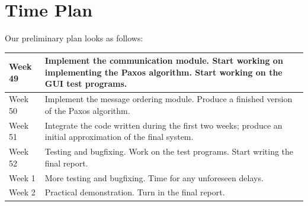\documentclass[10pt, oneside]{article}
\begin{document}
\pagebreak

\section{Time Plan}

Our preliminary plan looks as follows:

\begin{tabular}{|l|p{10cm}|}
  \hline
  Week 49 & Implement the communication module. Start working on implementing the
  Paxos algorithm. Start working on the GUI test programs. \\
  \hline
  Week 50 & Implement the message ordering module. Produce a finished version of the Paxos algorithm. \\
  \hline
  Week 51 & Integrate the code written during the first two weeks; produce an
  initial approximation of the final system. \\
  \hline
  Week 52 & Testing and bugfixing. Work on the test programs. Start writing the final report. \\
  \hline
  Week 1  & More testing and bugfixing. Time for any unforeseen delays. \\
  \hline
  Week 2  & Practical demonstration. Turn in the final report. \\
  \hline
\end{tabular}
\end{document}
